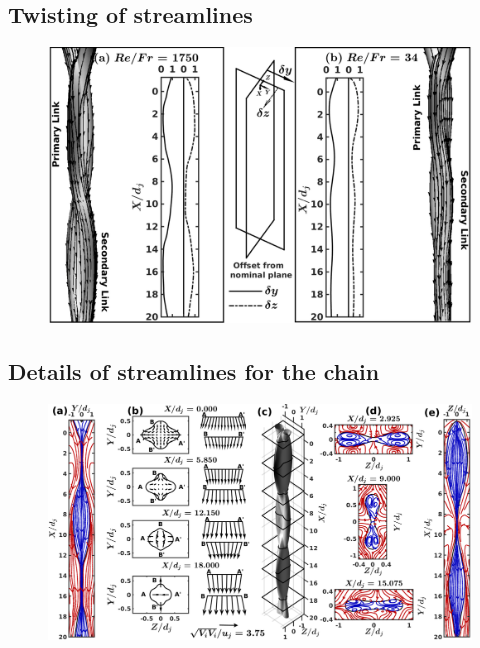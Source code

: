 \documentclass[%
aip,
sd,%
amsmath,amssymb,
preprint,%
author-year,%
]{revtex4-1}
\begin{document}
\subsection{Twisting of streamlines}
\begin{figure}[H]
	\centering
	\includegraphics[width=\linewidth]{fig1}
	\caption{}
	\label{Figure::stream}
\end{figure}
\lipsum[1]
\subsection{Details of streamlines for the chain}
\lipsum[1]
\begin{figure}[H]
	\centering
	\includegraphics[width=\linewidth]{streamlinesDetails}
	\caption{}
	\label{Figure::streamDetails}
\end{figure}
\lipsum[1]
\nocite{*}

\end{document}
